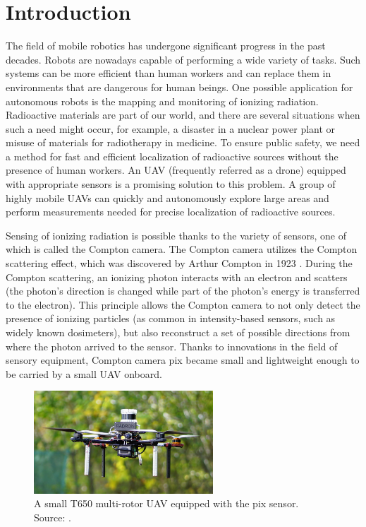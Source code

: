 \chapter{Introduction\label{chap:introduction}}
The field of mobile robotics has undergone significant progress in the past decades.
Robots are nowadays capable of performing a wide variety of tasks. 
Such systems can be more efficient than human workers and can replace them in environments that are dangerous for human beings.
One possible application for autonomous robots is the mapping and monitoring of ionizing radiation. 
Radioactive materials are part of our world, and there are several situations when such a need might occur, for example, a disaster in a nuclear power plant or misuse of materials for radiotherapy in medicine. 
To ensure public safety, we need a method for fast and efficient localization of radioactive sources without the presence of human workers.
An \ac{UAV} (frequently referred as a drone) equipped with appropriate sensors is a promising solution to this problem.
A group of highly mobile \ac{UAV}s can quickly and autonomously explore large areas and perform measurements needed for precise localization of radioactive sources.

Sensing of ionizing radiation is possible thanks to the variety of sensors, one of which is called the Compton camera.
The Compton camera utilizes the Compton scattering effect, which was discovered by Arthur Compton in 1923 \cite{compton}.
During the Compton scattering, an ionizing photon interacts with an electron and scatters (the photon's direction is changed while part of the photon's energy is transferred to the electron).
This principle allows the Compton camera to not only detect the presence of ionizing particles (as common in intensity-based sensors, such as widely known dosimeters), but also reconstruct a set of possible directions from where the photon arrived to the sensor.
Thanks to innovations in the field of sensory equipment, Compton camera \ac{pix} became small and lightweight enough to be carried by a small \ac{UAV} onboard.

\begin{figure}[!h]
    \centering
  \includegraphics[width=0.6\textwidth]{./fig/photos/uav.jpg}
    \caption{A small T650 multi-rotor UAV equipped with the \ac{pix} sensor. Source: \cite{baca2021gamma}.}
    \label{fig:uavvv}
\end{figure}

